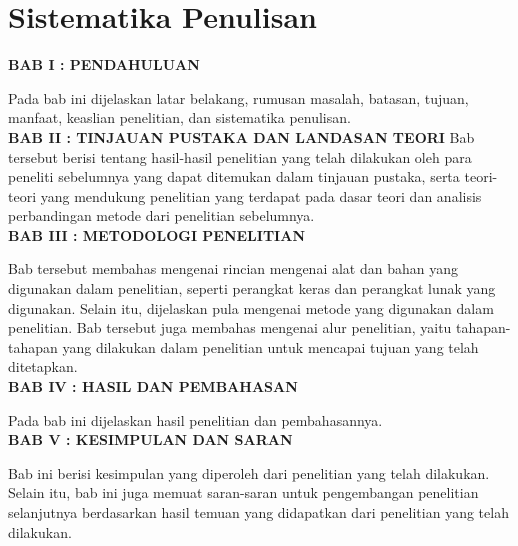 \section{Sistematika Penulisan}
\noindent
\textbf{BAB I : PENDAHULUAN}

Pada bab ini dijelaskan latar belakang, rumusan masalah, batasan, tujuan, manfaat, keaslian penelitian, dan sistematika penulisan.\\

\noindent
\textbf{BAB II : TINJAUAN PUSTAKA DAN LANDASAN TEORI}
Bab tersebut berisi tentang hasil-hasil penelitian yang telah dilakukan oleh para peneliti sebelumnya yang dapat ditemukan dalam tinjauan pustaka, serta teori-teori yang mendukung penelitian yang terdapat pada dasar teori dan analisis perbandingan metode dari penelitian sebelumnya.\\

\noindent
\textbf{BAB III : METODOLOGI PENELITIAN}

Bab tersebut membahas mengenai rincian mengenai alat dan bahan yang digunakan dalam penelitian, seperti perangkat keras dan perangkat lunak yang digunakan. Selain itu, dijelaskan pula mengenai metode yang digunakan dalam penelitian. Bab tersebut juga membahas mengenai alur penelitian, yaitu tahapan-tahapan yang dilakukan dalam penelitian untuk mencapai tujuan yang telah ditetapkan.\\

\noindent
\textbf{BAB IV : HASIL DAN PEMBAHASAN}

Pada bab ini dijelaskan hasil penelitian dan pembahasannya.\\

\noindent
\textbf{BAB V : KESIMPULAN DAN SARAN}

Bab ini berisi kesimpulan yang diperoleh dari penelitian yang telah dilakukan. Selain itu, bab ini juga memuat saran-saran untuk pengembangan penelitian selanjutnya berdasarkan hasil temuan yang didapatkan dari penelitian yang telah dilakukan.\\

\begin{comment}

\end{comment}
